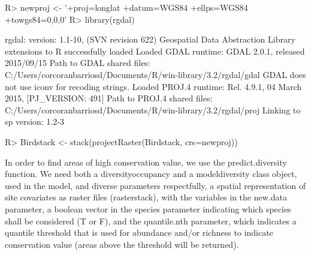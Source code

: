 \documentclass[article]{jss}
\begin{document}
\begin{CodeChunk}
\begin{CodeInput}
R> newproj <- '+proj=longlat +datum=WGS84 +ellps=WGS84 +towgs84=0,0,0'
R> library(rgdal)
\end{CodeInput}

\begin{CodeOutput}
rgdal: version: 1.1-10, (SVN revision 622)
 Geospatial Data Abstraction Library extensions to R successfully loaded
 Loaded GDAL runtime: GDAL 2.0.1, released 2015/09/15
 Path to GDAL shared files: C:/Users/corcoranbarriosd/Documents/R/win-library/3.2/rgdal/gdal
 GDAL does not use iconv for recoding strings.
 Loaded PROJ.4 runtime: Rel. 4.9.1, 04 March 2015, [PJ_VERSION: 491]
 Path to PROJ.4 shared files: C:/Users/corcoranbarriosd/Documents/R/win-library/3.2/rgdal/proj
 Linking to sp version: 1.2-3 
\end{CodeOutput}

\begin{CodeInput}
R> Birdstack <- stack(projectRaster(Birdstack, crs=newproj))
\end{CodeInput}
\end{CodeChunk}

In order to find areas of high conservation value, we use the
predict.diversity function. We need both a diversityoccupancy and a
modeldiversity class object, used in the model, and diverse parameters
respectfully, a spatial representation of site covariates as raster
files (rasterstack), with the variables in the new.data parameter, a
boolean vector in the species parameter indicating which species shall
be considered (T or F), and the quantile.nth parameter, which indicates
a quantile threshold that is used for abundance and/or richness to
indicate conservation value (areas above the threshold will be
returned).
\end{document}
